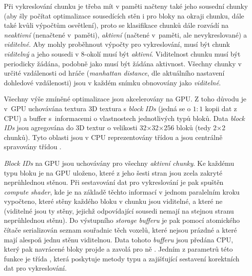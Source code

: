 Při vykreslování chunku je třeba mít v paměti načteny také jeho sousední chunky (aby šly počítat optimalizace sousedících stěn i pro bloky na okraji chunku, dále také kvůli výpočtům osvětlení), proto se klasifikace chunků dále rozvádí na \textit{neaktivní} (nenačtené v~paměti), \textit{aktivní} (načtené v~paměti, ale nevykreslované) a \textit{viditelné}. Aby mohly proběhnout výpočty pro vykreslování, musí být chunk \textit{viditelný} a jeho sousedi v 8-okolí musí být \textit{aktivní}. Viditelnost chunku musí být periodicky žádána, podobně jako musí být žádána aktivnost. Všechny chunky v určité vzdálenosti od hráče (\textit{manhattan distance}, dle aktuálního nastavení dohledové vzdálenosti) jsou v každém snímku obnovovány jako \textit{viditelné}.

Všechny výše zmíněné optimalizace jsou akcelerovány na GPU. Z toho důvodu je v~GPU uchovávána textura 3D textura s \textit{block IDs} (jedná se o $1:1$ kopii dat z CPU) a buffer s~informacemi o vlastnostech jednotlivých typů bloků. Data \textit{block IDs} jsou agregována do 3D textur o velikosti 32×32×256 bloků (tedy 2×2 chunků). Tyto oblasti jsou v CPU reprezentovány třídou  a jsou centrálně spravovány třídou .

\textit{Block IDs} na GPU jsou uchovávány pro všechny \textit{aktivní chunky}. Ke každému typu bloku je na GPU uloženo, které z jeho šesti stran jsou zcela zakryté neprůhlednou stěnou. Při sestavování dat pro vykreslování je pak spuštěn \textit{compute shader}, kde je na základě těchto informací v jednom paralelním kroku vypočteno, které stěny každého bloku v chunku jsou viditelné, a které ne (viditelné jsou ty stěny, jejichž odpovídající sousedi nemají na stejnou stranu neprůhlednou stěnu). Do výstupního \textit{storage bufferu} je pak pomocí atomického čítače serializován seznam souřadnic těch voxelů, které nejsou prázdné a které mají alespoň jednu stěnu viditelnou. Data tohoto \textit{bufferu} jsou předána CPU, který pak navrácené bloky projde a zavolá pro ně . Jedním z parametrů této funkce je třída , která poskytuje metody typu  a  zajišťující sestavení korektních dat pro vykreslování.

